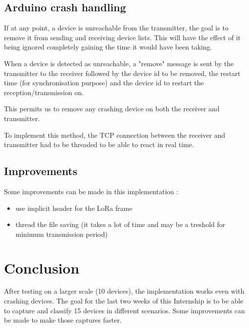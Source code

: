 \documentclass[a4paper, 12pt]{article}
\begin{document}
\subsection{Arduino crash handling}
If at any point, a device is unreachable from the transmitter, the goal is to remove it from sending and receiving device lists. This will have the effect of it being ignored completely gaining the time it would have been taking.

When a device is detected as unreachable, a "remove" message is sent by the transmitter to the receiver followed by the device id to be removed, the restart time (for synchronisation purpose) and the device id to restart the reception/transmission on.

This permits us to remove any crashing device on both the receiver and transmitter.

To implement this method, the TCP connection between the receiver and transmitter had to be threaded to be able to react in real time.

\subsection{Improvements}
Some improvements can be made in this implementation :
\begin{itemize}
  \item use implicit header for the LoRa frame
  \item thread the file saving (it takes a lot of time and may be a treshold for minimum transmission period)
\end{itemize}

\section{Conclusion}
After testing on a larger scale (10 devices), the implementation works even with crashing devices.
The goal for the last two weeks of this Internship is to be able to capture and classify 15 devices in different scenarios. 
Some improvements can be made to make those captures faster.
\end{document}
